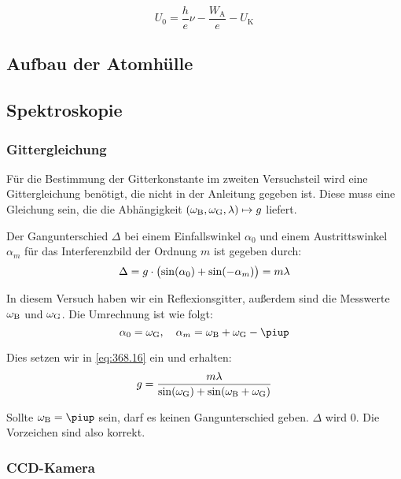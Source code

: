 \begin{equation}
    U_0 = \frac he\nu - \frac{W_\text{A}}e - U_\text{K}
    \label{eq:Energiebilanz}
\end{equation}

\subsection{Aufbau der Atomhülle}

\subsection{Spektroskopie}

\subsubsection{Gittergleichung}

Für die Bestimmung der Gitterkonstante im zweiten Versuchsteil wird eine
Gittergleichung benötigt, die nicht in der Anleitung gegeben ist. Diese muss
eine Gleichung sein, die die Abhängigkeit $(\omega_\text B, \omega_\text G,
\lambda) \mapsto g$ liefert.

Der Gangunterschied $\Delta$ bei einem Einfallswinkel $\alpha_0$ und einem
Austrittswinkel $\alpha_m$ für das Interferenzbild der Ordnung $m$ ist gegeben
durch: \cite[Formel~368.16]{physik312-Anleitung}
\begin{equation}
    \label{eq:368.16}
    \Delta = g \cdot \del{\sin(\alpha_0) + \sin(-\alpha_m)} = m \lambda
\end{equation}

In diesem Versuch haben wir ein Reflexionsgitter, außerdem sind die Messwerte
$\omega_\text B$ und $\omega_\text G$. Die Umrechnung ist wie folgt:
\[
    \alpha_0 = \omega_\text G
    \eqnsep
    \alpha_m = \omega_\text B + \omega_\text G - \piup
\]

Dies setzen wir in \eqref{eq:368.16} ein und erhalten:
\begin{equation}
    \label{eq:gittergleichung}
    g = \frac{m \lambda}{\sin(\omega_\text G) + \sin(\omega_\text B + \omega_\text G)}
\end{equation}

Sollte $\omega_\text B = \piup$ sein, darf es keinen Gangunterschied geben.
$\Delta$ wird 0. Die Vorzeichen sind also korrekt.

\subsubsection{CCD-Kamera}


